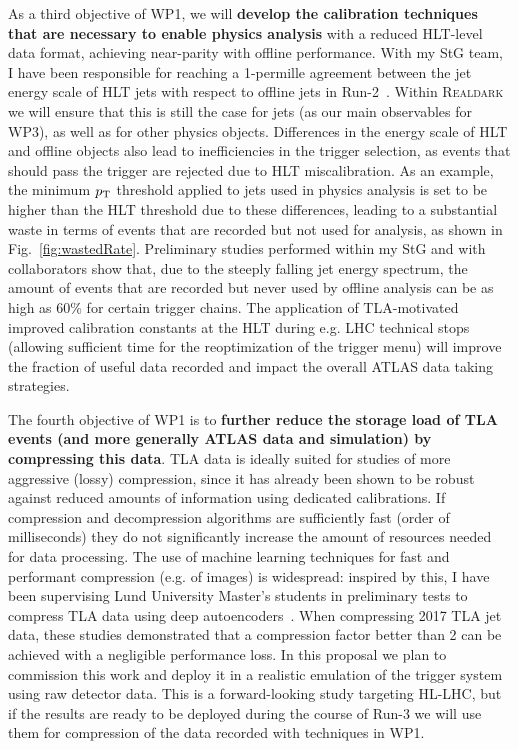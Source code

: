 As a third objective of WP1, we will \textbf{develop the calibration techniques that are necessary to enable physics analysis} with a reduced HLT-level data format, achieving near-parity with offline performance. 
With my StG team, I have been responsible for reaching a 1-permille agreement between the jet energy scale of HLT jets with respect to offline jets in Run-2~\cite{ToBeCited}.%
Within \textsc{Realdark} we will ensure that this is still the case for jets (as our main observables for WP3), as well as for other physics objects. 
Differences in the energy scale of HLT and offline objects also lead to inefficiencies in the trigger selection, as events that should pass the trigger are rejected due to HLT miscalibration. 
As an example, the minimum $p_{\rm{T}}$ threshold applied to jets used in physics analysis is set to be higher than the HLT threshold due to these differences, leading to a substantial waste in terms of events that are recorded but not used for analysis, as shown in Fig.~\ref{fig:wastedRate}. 
Preliminary studies performed within my StG and with collaborators show that, due to the steeply falling jet energy spectrum, the amount of events that are recorded but never used by offline analysis can be as high as 60\% for certain trigger chains. 
The application of TLA-motivated improved calibration constants at the HLT during e.g. LHC technical stops (allowing sufficient time for the reoptimization of the trigger menu) will improve the fraction of useful data recorded and impact the overall ATLAS data taking strategies. 

The fourth objective of WP1 is to \textbf{further reduce the storage load of TLA events (and more generally ATLAS data and simulation) by compressing this data}. 
TLA data is ideally suited for studies of more aggressive (lossy) compression, since it has already been shown to be robust against reduced amounts of information using dedicated calibrations. If compression and decompression algorithms are sufficiently fast (order of milliseconds) they do not significantly increase the amount of resources needed for data processing. 
The use of machine learning techniques for fast and performant compression (e.g. of images) is widespread: inspired by this, I have been supervising Lund University Master’s students in preliminary tests to compress TLA data using deep autoencoders~\cite{ToBeCited}. %
When compressing 2017 TLA jet data, these studies demonstrated that a compression factor better than 2 can be achieved with a negligible performance loss.  
In this proposal we plan to commission this work and deploy it in a realistic emulation of the trigger system using raw detector data. This is a forward-looking study targeting HL-LHC, but if the results are ready to be deployed during the course of Run-3 we will use them for compression of the data recorded with techniques in WP1. 

